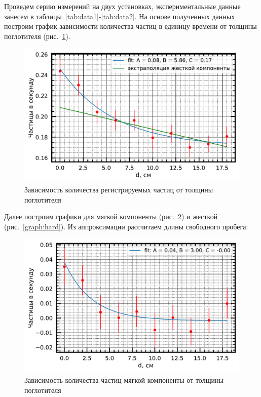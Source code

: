 \documentclass[reprint, nofootinbib, nobalancelastpage, 10pt]{revtex4-2}
\begin{document}
Проведем серию измерений на двух установках, экспериментальные данные занесем в
таблицы~\ref{tab:data1}-\ref{tab:data2}. На основе полученных данных построим график
зависимости количества частиц в единицу времени от толщины поглотителя
(рис.~\ref{graph:gnrl}).

\begin{figure}[h!]
	\includegraphics[width=0.95\linewidth]{plot_1.pdf}
	\caption{Зависимость количества регистрируемых частиц от толщины поглотителя}
	\label{graph:gnrl}
\end{figure}

Далее построим графики для мягкой компоненты (рис.~\ref{graph:soft}) и жесткой
(рис.~\ref{graph:hard}). Из аппроксимации рассчитаем длины свободного пробега:

\begin{figure}[h!]
	\includegraphics[width=0.95\linewidth]{plot_2.pdf}
	\caption{Зависимость количества частиц мягкой компоненты от толщины поглотителя}
	\label{graph:soft}
\end{figure}
\end{document}

